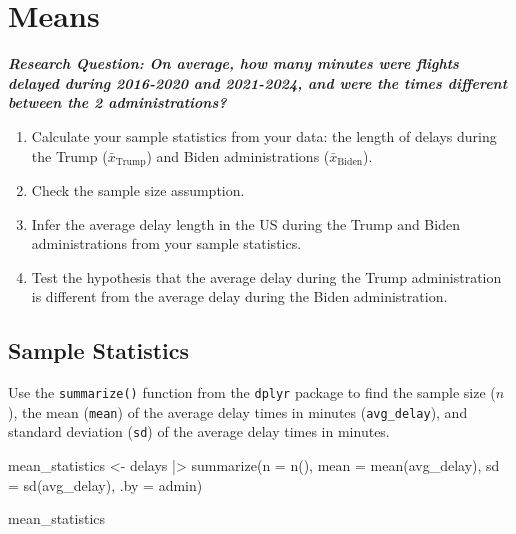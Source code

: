 \documentclass[
  letterpaper,
  DIV=11,
  numbers=noendperiod]{scrartcl}
\newenvironment{Shaded}{\begin{snugshade}}{\end{snugshade}}
\newcommand{\AttributeTok}[1]{\textcolor[rgb]{0.40,0.45,0.13}{#1}}
\newcommand{\FunctionTok}[1]{\textcolor[rgb]{0.28,0.35,0.67}{#1}}
\newcommand{\NormalTok}[1]{\textcolor[rgb]{0.00,0.23,0.31}{#1}}
\newcommand{\OtherTok}[1]{\textcolor[rgb]{0.00,0.23,0.31}{#1}}
\newcommand{\SpecialCharTok}[1]{\textcolor[rgb]{0.37,0.37,0.37}{#1}}
\newcommand{\StringTok}[1]{\textcolor[rgb]{0.13,0.47,0.30}{#1}}
\begin{document}
\section{Means}\label{means}

\textbf{\emph{Research Question: On average, how many minutes were
flights delayed during 2016-2020 and 2021-2024, and were the times
different between the 2 administrations?}}

\begin{enumerate}
\def\labelenumi{\arabic{enumi}.}
\item
  Calculate your sample statistics from your data: the length of delays
  during the Trump (\(\bar{x}_{\text{Trump}}\)) and Biden
  administrations (\(\bar{x}_{\text{Biden}}\)).
\item
  Check the sample size assumption.
\item
  Infer the average delay length in the US during the Trump and Biden
  administrations from your sample statistics.
\item
  Test the hypothesis that the average delay during the Trump
  administration is different from the average delay during the Biden
  administration.
\end{enumerate}

\subsection{Sample Statistics}\label{sample-statistics-1}

Use the \texttt{summarize()} function from the \texttt{dplyr} package to
find the sample size (\(n\)), the mean (\texttt{mean}) of the average
delay times in minutes (\texttt{avg\_delay}), and standard deviation
(\texttt{sd}) of the average delay times in minutes.

\begin{Shaded}
\begin{Highlighting}[]
\NormalTok{mean\_statistics }\OtherTok{\textless{}{-}}\NormalTok{ delays }\SpecialCharTok{|\textgreater{}}
  \FunctionTok{summarize}\NormalTok{(}\AttributeTok{n =} \FunctionTok{n}\NormalTok{(), }
            \AttributeTok{mean =} \FunctionTok{mean}\NormalTok{(avg\_delay), }
            \AttributeTok{sd =} \FunctionTok{sd}\NormalTok{(avg\_delay),}
            \AttributeTok{.by =} \StringTok{\textquotesingle{}admin\textquotesingle{}}\NormalTok{)}

\NormalTok{mean\_statistics }
\end{Highlighting}
\end{Shaded}
\end{document}
